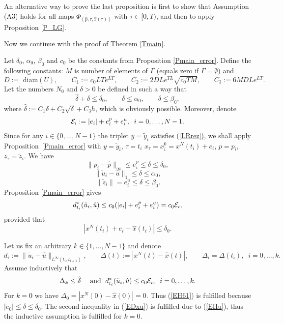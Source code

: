 \documentclass[11pt]{article}
\newcommand{\bd}{\begin{displaymath}}
\newcommand{\ed}{\end{displaymath}}
\newcommand{\be}{\begin{equation}}
\newcommand{\ee}{\end{equation}}
\newcommand{\E}{{\cal E}}
\newcommand{\al}{\alpha}
\newcommand{\tu}{{\tilde u}}
\newcommand{\hu}{{\hat u}}
\newcommand{\bino}{\bigskip\noindent}
\begin{document}
An alternative way to prove the last proposition is first to show that Assumption (A3) holds for all maps 
$\Phi_{(\hat p,\tau, \hat x(\tau))}$ with $\tau \in [0,T)$, and then to apply Proposition \ref{P_LG}.

\bino
Now we continue with the proof of Theorem \ref{Tmain}.

Let $\delta_0$, $\al_0$, $\beta_0$ and $c_0$ be the constants from Proposition \ref{Pmain_error}.
Define the following constants: $M$ is number of elements of $\Gamma$ (equals zero if $\Gamma = \emptyset$) and
\be \label{Econst}
    D := \mbox{ diam}(U), \qquad 
           \bar C_1 := c_0 L T e^{LT}, \qquad \bar C_2 := 2 D L e^{TL} \sqrt{c_0TM}, 
             \qquad   \bar C_3 := 6 M D L e^{LT}.
\ee
Let the numbers $N_0$ and $\delta > 0$ be defined in such a way that
\bd
            \hat \delta + \delta \leq \delta_0, \qquad  \delta \leq \al_0, \qquad \delta \leq \beta_0,
\ed
where $\hat \delta :=\bar C_1 \delta + \bar C_2 \sqrt{\delta} + \bar C_3 h$,
which is obviously possible.
Moreover, denote 
\bd
                {\cal E}_i := |e_i| + e^p_i + e^{u}_i,   \;\; i = 0, \ldots, N-1.
\ed
Since for any $i \in \{ 0, \ldots, N-1 \}$ the triplet $y = \tilde y_i$ satisfies (\ref{LRrez}), we shall apply 
Proposition~\ref{Pmain_error} 
with $y = \tilde y_i$, $\tau = t_i$ $x_\tau = x_i^0 = x^N(t_i) + e_i$, $p = p_i$, $z_\tau = \tilde z_i$. We have
\bd
                  \| p_i - \hat p \|_\infty \leq e^p_i \leq \delta \leq \delta_0,
\ed
\bd
            \| \tilde u_i - \hat u \|_1  \leq \delta \leq \alpha_0,
\ed
\bd
             \| \tilde z_i \| = e_i^{u} \leq \delta \leq \beta_0.  
\ed
Proposition \ref{Pmain_error} gives 
\be \label{EHu}
            d^*_{t_i}(\tilde u_i, \hat u)  \leq c_0 (|e_i| + e^p_i + e^{u}_i) =  c_0 \E_i,
\ee
provided that 
\be \label{EH61}
               | x^N(t_i) + e_i - \hat x(t_i) | \leq \delta_0. 
\ee

Let us fix an arbitrary $k \in \{1, \ldots, N-1 \}$ and denote
\bd
     d_i := \| \tu_i - \hu \|_{L^\infty(t_i,t_{i+1})}, \qquad 
        \Delta(t) := |x^N(t) - \hat x(t)|, \qquad \Delta_i = \Delta(t_i), \;\; i = 0, \ldots, k.
\ed 
Assume inductively that 
\be \label{EDxu}
    \Delta_k \leq \hat \delta \quad \mbox{ and } \;  d^*_{t_i}(\tilde u_i, \hat u) \leq c_0 \E_i, \;\; i=0, \ldots, k.
\ee
For $k=0$ we have $\Delta_0 = |x^N(0) - \hat x(0)|  = 0$. Thus (\ref{EH61}) is fulfilled because 
$|e_0| \leq \delta \leq \delta_0$. 
The second inequality in (\ref{EDxu}) is fulfilled due to (\ref{EHu}), thus
the inductive assumption is fulfilled for $k = 0$.
\end{document}
